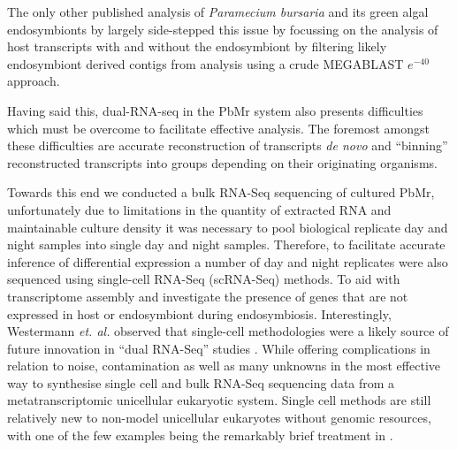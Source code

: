The only other published analysis of \textit{Paramecium bursaria} and its green algal endosymbionts by \citep{Kodama2014} largely
side-stepped this issue by focussing on the analysis of host transcripts with and without the endosymbiont by filtering
likely endosymbiont derived contigs from analysis using a crude MEGABLAST \(e^{-40}\) approach.






Having said this, dual-RNA-seq in the PbMr system also presents difficulties which must be overcome to facilitate effective analysis.
The foremost amongst these difficulties are accurate reconstruction of transcripts \textit{de novo} and ``binning'' reconstructed
transcripts into groups depending on their originating organisms.  



%




Towards this end we conducted a bulk RNA-Seq sequencing of cultured PbMr, unfortunately due to limitations in the quantity of
extracted RNA and maintainable culture density it was necessary to pool biological replicate day and night samples into single
day and night samples.  Therefore, to facilitate accurate inference of differential expression 
a number of day and night replicates were also sequenced using single-cell RNA-Seq (scRNA-Seq) methods.
To aid with transcriptome assembly and investigate the presence of genes that are not expressed in host
or endosymbiont during endosymbiosis.  Interestingly, Westermann \textit{et. al.} observed that single-cell methodologies were a likely source of future
innovation in ``dual RNA-Seq'' studies \citep{Westermann2012}.
While offering complications in relation to noise, contamination as well as many unknowns in the most effective way to synthesise
single cell and bulk RNA-Seq sequencing data from a metatranscriptomic unicellular eukaryotic system.
Single cell methods are still relatively new to non-model unicellular eukaryotes without genomic resources, with one of the few
examples being the remarkably brief treatment in \citep{Kolisko2014}.






